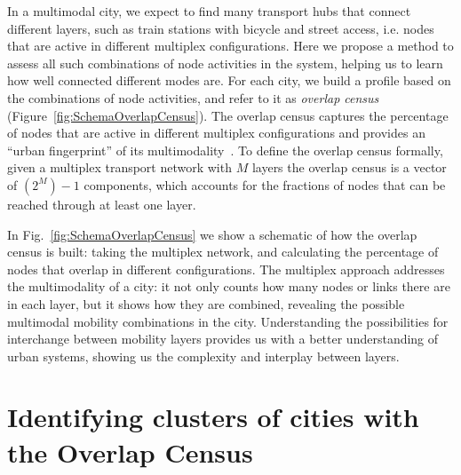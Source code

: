 In a multimodal city, we expect to find many transport hubs that connect different layers, such as train stations with bicycle and street access, i.e. nodes that are active in different multiplex configurations. Here we propose a method to assess all such combinations of node activities in the system, helping us to learn how well connected different modes are. For each city, we build a profile based on the combinations of node activities, and refer to it as \emph{overlap census} (Figure~\ref{fig:SchemaOverlapCensus}). The overlap census captures the percentage of nodes that are active in different multiplex configurations and provides an ``urban fingerprint'' of its multimodality~\cite{Aleta2017Multilayer}. To define the overlap census formally, given a multiplex transport network with $M$ layers the overlap census is a vector of $(2^M)-1$ components, which accounts for the fractions of nodes that can be reached through at least one layer.

In Fig.~\ref{fig:SchemaOverlapCensus} we show a schematic of how the overlap census is built: taking the multiplex network, and calculating the percentage of nodes that overlap in different configurations. The multiplex approach addresses the multimodality of a city: it not only counts how many nodes or links there are in each layer, but it shows how they are combined, revealing the possible multimodal mobility combinations in the city. Understanding the possibilities for interchange between mobility layers provides us with a better understanding of urban systems, showing us the complexity and interplay between layers.


\section{Identifying clusters of cities with the Overlap Census}

